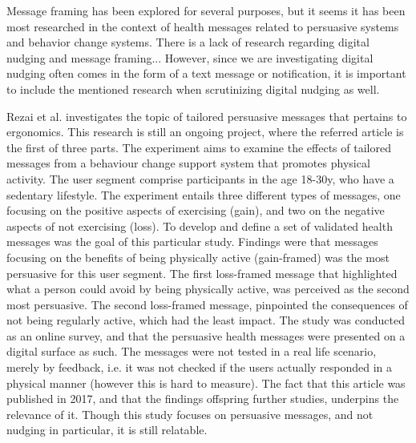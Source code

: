 Message framing has been explored for several purposes, but it seems it has been most researched in the context of health messages related to persuasive systems and behavior change systems. There is a lack of research regarding digital nudging and message framing... However, since we are investigating digital nudging often comes in the form of a text message or notification, it is important to include the mentioned research when scrutinizing digital nudging as well. 

Rezai et al.
investigates the topic of tailored persuasive messages that pertains to ergonomics. This research is still an ongoing project, where the referred article is the first of three parts. The experiment aims to examine the effects of tailored messages from a behaviour change support system that promotes physical activity. The user segment comprise participants in the age 18-30y, who have a sedentary lifestyle. The experiment entails three different types of messages, one focusing on the positive aspects of exercising (gain), and two on the negative aspects of not exercising (loss). To develop and define a set of validated health messages was the goal of this particular study. Findings were that messages focusing on the benefits of being physically active (gain-framed) was the most persuasive for this user segment. The first loss-framed message that highlighted what a person could avoid by being physically active, was perceived as the second most persuasive. The second loss-framed message, pinpointed the consequences of not being regularly active, which had the least impact. The study was conducted as an online survey, and that the persuasive health messages were presented on a digital surface as such. The messages were not tested in a real life scenario, merely by feedback, i.e. it was not checked if the users actually responded in a physical manner (however this is hard to measure). The fact that this article was published in 2017, and that the findings offspring further studies, underpins the relevance of it. Though this study focuses on persuasive messages, and not nudging in particular, it is still relatable.

